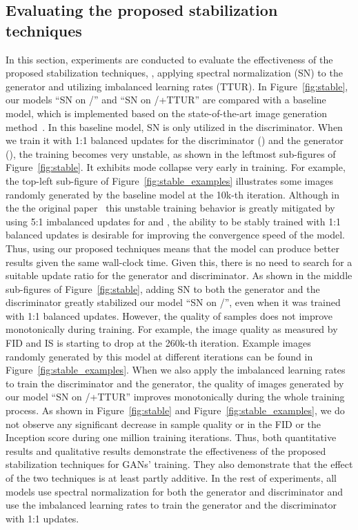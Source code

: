 \documentclass{article}
\begin{document}
\subsection{Evaluating the proposed stabilization techniques} \label{sec:sagan_stable}

In this section, experiments are conducted to evaluate the effectiveness of the proposed stabilization techniques, \ie, applying spectral normalization (SN) to the generator and utilizing imbalanced learning rates (TTUR). In Figure~\ref{fig:stable}, our models ``SN on /'' and ``SN on /+TTUR'' are compared with a baseline model, which is implemented based on the state-of-the-art image generation method~\cite{Miyato18a}. In this baseline model, SN is only utilized in the discriminator. When we train it with 1:1 balanced updates for the discriminator () and the generator (), the training becomes very unstable, as shown in the leftmost sub-figures of Figure~\ref{fig:stable}. It exhibits mode collapse very early in training. For example, the top-left sub-figure of Figure~\ref{fig:stable_examples} illustrates some images randomly generated by the baseline model at the 10k-th iteration. Although in the the original paper~\cite{Miyato18a} this unstable training behavior is greatly mitigated by using 5:1 imbalanced updates for  and , the ability to be stably trained with 1:1 balanced updates is desirable for improving the convergence speed of the model. Thus, using our proposed techniques means that the model can produce better results given the same wall-clock time. Given this, there is no need to search for a suitable update ratio for the generator and discriminator. As shown in the middle sub-figures of Figure~\ref{fig:stable}, adding SN to both the generator and the discriminator greatly stabilized our model ``SN on /'', even when it was trained with 1:1 balanced updates. However, the quality of samples does not improve monotonically during training. For example, the image quality as measured by FID and IS is starting to drop at the 260k-th iteration. Example images randomly generated by this model at different iterations can be found in Figure~\ref{fig:stable_examples}. When we also apply the imbalanced learning rates to train the discriminator and the generator, the quality of images generated by our model ``SN on /+TTUR'' improves monotonically during the whole training process. As shown in Figure~\ref{fig:stable} and Figure~\ref{fig:stable_examples}, we do not observe any significant decrease in sample quality or in the FID or the Inception score during one million training iterations. Thus, both quantitative results and qualitative results demonstrate the effectiveness of the proposed stabilization techniques for GANs' training. They also demonstrate that the effect of the two techniques is at least partly additive. In the rest of experiments, all models use spectral normalization for both the generator and discriminator and use the imbalanced learning rates to train the generator and the discriminator with 1:1 updates.
\end{document}
